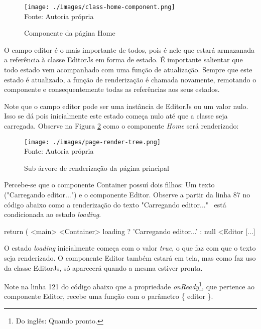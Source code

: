 \begin{figure}[H]
    \centering
    \caption{Componente da página Home}
    \texttt{[image: ./images/class-home-component.png]}
    \label{fig:class-home-component} \\
    \textnormal{\fontsize{10pt}{12pt}Fonte: Autoria própria}
\end{figure}

O campo editor é o mais importante de todos, pois é nele
que estará armazanada a referência à classe EditorJs em forma de estado.
É importante salientar que todo estado vem acompanhado com uma função
de atualização. Sempre que este estado é atualizado, a função de renderização
é chamada novamente, remotando o componente e consequentemente todas as referências
aos seus estados.

Note que o campo editor pode ser uma instância de EditorJs ou um valor nulo.
Isso se dá pois inicialmente este estado começa nulo até que a classe seja
carregada.
Observe na
Figura \ref{fig:page-render-tree}
como o componente \textit{Home} será renderizado:

\begin{figure}[H]
    \centering
    \caption{Sub árvore de renderização da página principal}
    \texttt{[image: ./images/page-render-tree.png]}
    \label{fig:page-render-tree} \\
    \textnormal{\fontsize{10pt}{12pt}Fonte: Autoria própria}
\end{figure}

Percebe-se que o componente Container possuí dois filhos: Um texto
("Carregando editor...") e o componente Editor.
Observe a partir da linha 87 no código abaixo como a renderização
do texto "Carregando editor..."~ está condicionada ao estado \textit{loading}.

\begin{Codebbf303d54aec41d4a884ff204b49d962}
[...]
return (
    <main>
        <Container>
            {
                loading
                    ? 'Carregando editor...'
                    : null
            }
            <Editor
[...]
\end{Codebbf303d54aec41d4a884ff204b49d962}

O estado \textit{loading} inicialmente começa com o valor \textit{true}, o que
faz com que o texto seja renderizado. O componente
Editor também estará em tela, mas como faz uso da classe EditorJs,
só aparecerá quando a mesma estiver pronta.

Note na linha 121 do código abaixo que a propriedade
\textit{onReady}\footnote{Do inglês: Quando pronto.
},
que pertence ao componente Editor, recebe uma função
com o parâmetro \{ editor \}.

